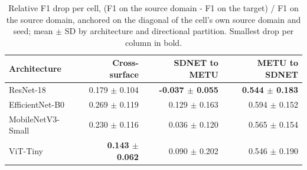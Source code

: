 \begin{table}[htbp]
\centering
\caption{Relative F1 drop per cell, (F1 on the source domain - F1 on the target) / F1 on the source domain, anchored on the diagonal of the cell's own source domain and seed; mean $\pm$ SD by architecture and directional partition. Smallest drop per column in bold.}
\label{tab:caida-relativa}
\begin{tabular}{lrrr}
\toprule
Architecture & Cross-surface & SDNET to METU & METU to SDNET \\
\midrule
ResNet-18 & 0.179 $\pm$ 0.104 & \textbf{-0.037 $\pm$ 0.055} & \textbf{0.544 $\pm$ 0.183} \\
EfficientNet-B0 & 0.269 $\pm$ 0.119 & 0.129 $\pm$ 0.163 & 0.594 $\pm$ 0.152 \\
MobileNetV3-Small & 0.230 $\pm$ 0.116 & 0.036 $\pm$ 0.120 & 0.565 $\pm$ 0.154 \\
ViT-Tiny & \textbf{0.143 $\pm$ 0.062} & 0.090 $\pm$ 0.202 & 0.546 $\pm$ 0.190 \\
\bottomrule
\end{tabular}
\end{table}
